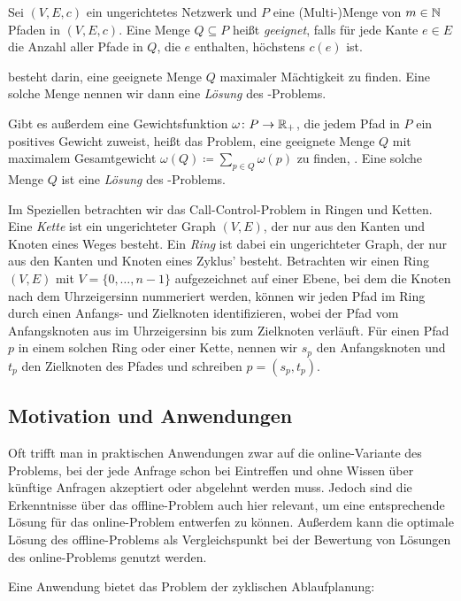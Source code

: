 \begin{definition}
    Sei $(V,E,c)$ ein ungerichtetes Netzwerk und $P$ eine (Multi-)Menge von $m \in \mathbb N$ Pfaden in $(V,E,c)$.
    Eine Menge $Q \subseteq P$ heißt {\em geeignet}, falls für jede Kante $e \in E$ die Anzahl aller Pfade in $Q$,
    die $e$ enthalten, höchstens $c(e)$ ist.
    
    {\em \CallControl} besteht darin, eine geeignete Menge $Q$ maximaler Mächtigkeit zu finden.
    Eine solche Menge nennen wir dann eine {\em Lösung} des \CallControl-Problems.
    
    Gibt es außerdem eine Gewichtsfunktion $\omega \colon P \rightarrow \mathbb R_+$, die jedem Pfad in $P$ ein 
    positives Gewicht zuweist, heißt das Problem, eine geeignete Menge $Q$ mit maximalem Gesamtgewicht
    $\omega(Q) \coloneqq \sum_{p \in Q} \omega(p)$ zu finden, {\em \WeightedCallControl}.
    Eine solche Menge $Q$ ist eine {\em Lösung} des \WeightedCallControl-Problems.
\end{definition}

Im Speziellen betrachten wir das Call-Control-Problem in Ringen und Ketten.
Eine {\em Kette} ist ein ungerichteter Graph $(V,E)$, der nur aus den Kanten und Knoten eines Weges besteht.
Ein {\em Ring} ist dabei ein ungerichteter Graph, der nur aus den Kanten und Knoten eines Zyklus' besteht.
Betrachten wir einen Ring $(V,E)$ mit $V=\{0, \dots , n-1\}$ aufgezeichnet auf einer Ebene, bei dem die Knoten nach
dem Uhrzeigersinn nummeriert werden, können wir jeden Pfad im Ring durch einen Anfangs- und Zielknoten identifizieren,
wobei der Pfad vom Anfangsknoten aus im Uhrzeigersinn bis zum Zielknoten \glqq verläuft\grqq.
Für einen Pfad $p$ in einem solchen Ring oder einer Kette, nennen wir $s_p$ den
Anfangsknoten und $t_p$ den Zielknoten des Pfades und schreiben $p=(s_p, t_p)$.


\subsection{Motivation und Anwendungen}\label{subsec:motivationUndAnwendungen}

Oft trifft man in praktischen Anwendungen zwar auf die online-Variante des Problems, bei der jede Anfrage schon bei Eintreffen und
ohne Wissen über künftige Anfragen akzeptiert oder abgelehnt werden muss.
Jedoch sind die Erkenntnisse über das offline-Problem auch hier relevant, um eine entsprechende Lösung für das
online-Problem entwerfen zu können.
Außerdem kann die optimale Lösung des offline-Problems als Vergleichspunkt bei der Bewertung von Lösungen des
online-Problems genutzt werden.

Eine Anwendung bietet das Problem der zyklischen Ablaufplanung:

